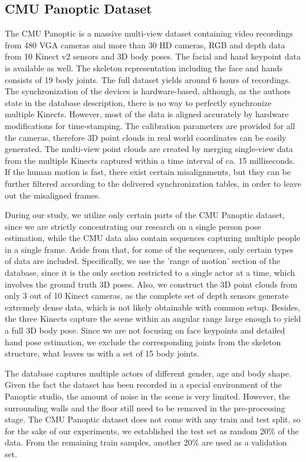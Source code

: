 \subsection{CMU Panoptic Dataset}

The CMU Panoptic \cite{Joo_2017_TPAMI} is a massive multi-view dataset containing video recordings from 480 VGA cameras and more than 30 HD cameras, RGB and depth data from 10 Kinect v2 sensors and 3D body poses. The facial and hand keypoint data is available as well. The skeleton representation including the face and hands consists of 19 body joints. The full dataset yields around 6 hours of recordings. The synchronization of the devices is hardware-based, although, as the authors state in the database description, there is no way to perfectly synchronize multiple Kinects. However, most of the data is aligned accurately by hardware modifications for time-stamping. The calibration parameters are provided for all the cameras, therefore 3D point clouds in real world coordinates can be easily generated. The multi-view point clouds are created by merging single-view data from the multiple Kinects captured within a time interval of ca. 15 milliseconds. If the human motion is fast, there exist certain misalignments, but they can be further filtered according to the delivered synchronization tables, in order to leave out the misaligned frames.\par
\vspace{5mm}
\noindent
During our study, we utilize only certain parts of the CMU Panoptic dataset, since we are strictly concentrating our research on a single person pose estimation, while the CMU data also contain sequences capturing multiple people in a single frame. Aside from that, for some of the sequences, only certain types of data are included. Specifically, we use the 'range of motion' section of the database, since it is the only section restricted to a single actor at a time, which involves the ground truth 3D poses. Also, we construct the 3D point clouds from only 3 out of 10 Kinect cameras, as the complete set of depth sensors generate extremely dense data, which is not likely obtainable with common setup. Besides, the three Kinects capture the scene within an angular range large enough to yield a full 3D body pose. Since we are not focusing on face keypoints and detailed hand pose estimation, we exclude the corresponding joints from the skeleton structure, what leaves us with a set of 15 body joints.\par
\vspace{5mm}
\noindent The database captures multiple actors of different gender, age and body shape. Given the fact the dataset has been recorded in a special environment of the Panoptic studio, the amount of noise in the scene is very limited. However, the surrounding walls and the floor still need to be removed in the pre-processing stage. The CMU Panoptic dataset does not come with any train and test split, so for the sake of our experiments, we established the test set as random 20\% of the data. From the remaining train samples, another 20\% are used as a validation set.


